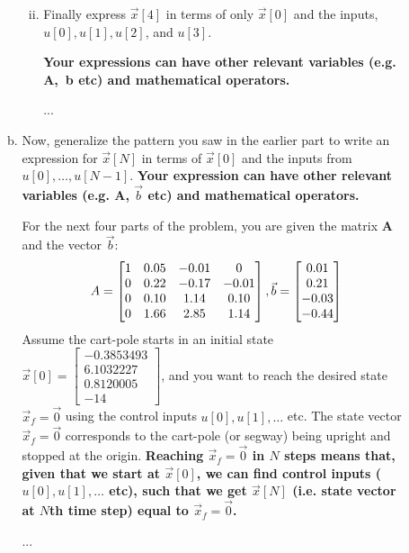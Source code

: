 \documentclass[11pt]{article}
\def\A{\textbf{A}} %
\begin{document}
\begin{enumerate}
\begin{enumerate}
\begin{enumerate}[(a)]
\begin{enumerate}[i.]
	      		      \vspace{10px}
	      		\item Finally express $\vec x[4]$ in terms of only $\vec x[0]$ and the inputs, $u[0], u[1], u[2]$, and $u[3]$.
	      		                          
	      		      \textbf{Your expressions can have other relevant variables (e.g. A,~b etc) and mathematical operators.}
	      		      \begin{Answer}
	      		      	...
	      		      \end{Answer}
	      	\end{enumerate}
	      		      	    
	      		      	    
	      	\newpage
	      		      	    
	      	\item Now, generalize the pattern you saw in the earlier part to write an expression for $\vec x[N]$ in terms of $\vec x[0]$ and the inputs from $u[0],\ldots ,u[N - 1]$. \textbf{Your expression can have other relevant variables (e.g. $\A$, $\vec b$ etc) and mathematical operators.}
	      	      	      	    
	      	      For the next four parts of the problem, you are given the matrix $\A$ and the vector $\vec b$: 
	      	      \[
	      	      	A = \begin{bmatrix}
	      	      	1 & 0.05 & -0.01 & 0 \\
	      	      	0 & 0.22 & -0.17 & -0.01 \\
	      	      	0 & 0.10 & 1.14 & 0.10 \\
	      	      	0 & 1.66 & 2.85 & 1.14
	      	      	\end{bmatrix}, \\  \vec b = \begin{bmatrix}
	      	      	0.01 \\
	      	      	0.21 \\
	      	      	-0.03 \\
	      	      	-0.44	      	    
	      	      	\end{bmatrix}
	      	      \]
	      	      Assume the cart-pole starts in an initial state $\vec x[0] = \begin{bmatrix}
	      	      -0.3853493 \\
	      	      6.1032227 \\
	      	      0.8120005 \\
	      	      -14
	      	\end{bmatrix}$, and you want to reach the desired state $\vec x_f = \vec 0$ using the control inputs $u[0],u[1],\ldots$ etc. The state vector $\vec x_f =\vec 0$ corresponds to the cart-pole (or segway) being upright and stopped at the origin. \textbf{Reaching $\vec x_f =\vec 0$ in $N$ steps means that, given that we start at $\vec x[0]$, we can find control inputs ($u[0],u[1],\ldots$ etc), such that we get $\vec x[N]$ (i.e. state vector at $N$th time step) equal to $\vec x_f =\vec 0$.}
	      	\begin{Answer}
	      		...
	      	\end{Answer}
	      		      	    

\end{enumerate}
\end{enumerate}
\end{enumerate}
\end{document}
